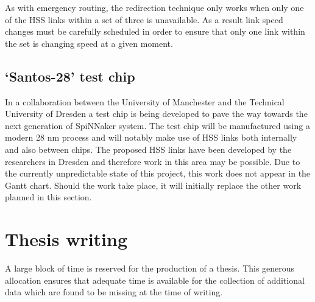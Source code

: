 			As with emergency routing, the redirection technique only works when only
			one of the HSS links within a set of three is unavailable. As a result
			link speed changes must be carefully scheduled in order to ensure that
			only one link within the set is changing speed at a given moment.
		
		\subsection{`Santos-28' test chip}
			
			
			In a collaboration between the University of Manchester and the Technical
			University of Dresden a test chip is being developed to pave the way
			towards the next generation of SpiNNaker system. The test chip will be
			manufactured using a modern 28 nm process and will notably make use of HSS
			links both internally and also between chips. The proposed HSS links have
			been developed by the researchers in Dresden and therefore work in this
			area may be possible. Due to the currently unpredictable state of this
			project, this work does not appear in the Gantt chart. Should the work
			take place, it will initially replace the other work planned in this
			section.
	
	\section{Thesis writing}
		
		A large block of time is reserved for the production of a thesis. This
		generous allocation ensures that adequate time is available for the
		collection of additional data which are found to be missing at the time of
		writing.
